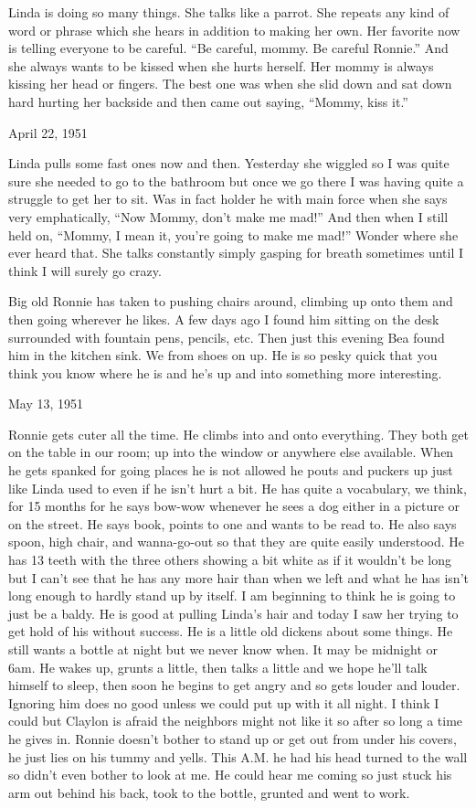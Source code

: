 \documentclass[]{book}
\begin{document}
Linda is doing so many things. She talks like a parrot. She repeats any kind of word or phrase which she hears in addition to making her own. Her favorite now is telling everyone to be careful. ``Be careful, mommy. Be careful Ronnie.'' And she always wants to be kissed when she hurts herself. Her mommy is always kissing her head or fingers. The best one was when she slid down and sat down hard hurting her backside and then came out saying, ``Mommy, kiss it.''

April 22, 1951

Linda pulls some fast ones now and then. Yesterday she wiggled so I was quite sure she needed to go to the bathroom but once we go there I was having quite a struggle to get her to sit. Was in fact holder he with main force when she says very emphatically, ``Now Mommy, don't make me mad!'' And then when I still held on, ``Mommy, I mean it, you're going to make me mad!'' Wonder where she ever heard that. She talks constantly simply gasping for breath sometimes until I think I will surely go crazy.

Big old Ronnie has taken to pushing chairs around, climbing up onto them and then going wherever he likes. A few days ago I found him sitting on the desk surrounded with fountain pens, pencils, etc. Then just this evening Bea found him in the kitchen sink. We from shoes on up. He is so pesky quick that you think you know where he is and he's up and into something more interesting.

May 13, 1951

Ronnie gets cuter all the time. He climbs into and onto everything. They both get on the table in our room; up into the window or anywhere else available. When he gets spanked for going places he is not allowed he pouts and puckers up just like Linda used to even if he isn't hurt a bit. He has quite a vocabulary, we think, for 15 months for he says bow-wow whenever he sees a dog either in a picture or on the street. He says book, points to one and wants to be read to. He also says spoon, high chair, and wanna-go-out so that they are quite easily understood. He has 13 teeth with the three others showing a bit white as if it wouldn't be long but I can't see that he has any more hair than when we left and what he has isn't long enough to hardly stand up by itself. I am beginning to think he is going to just be a baldy. He is good at pulling Linda's hair and today I saw her trying to get hold of his without success. He is a little old dickens about some things. He still wants a bottle at night but we never know when. It may be midnight or 6am. He wakes up, grunts a little, then talks a little and we hope he'll talk himself to sleep, then soon he begins to get angry and so gets louder and louder. Ignoring him does no good unless we could put up with it all night. I think I could but Claylon is afraid the neighbors might not like it so after so long a time he gives in. Ronnie doesn't bother to stand up or get out from under his covers, he just lies on his tummy and yells. This A.M. he had his head turned to the wall so didn't even bother to look at me. He could hear me coming so just stuck his arm out behind his back, took to the bottle, grunted and went to work.
\end{document}
